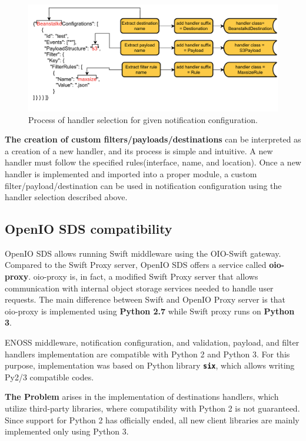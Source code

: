     \begin{figure}[H]
        \centering
        \includegraphics[width=1\textwidth]{obrazky-figures/enoss-handler-selection.pdf}
        \caption{Process of handler selection for given notification configuration.}
        \label{fig:enoss-handler-selection}
    \end{figure}

    \textbf{The creation of custom filters/payloads/destinations} can be interpreted as a creation of a new handler, and its process is simple and intuitive. A new handler must follow the specified rules(interface, name, and location). Once a new handler is implemented and imported into a proper module, a custom filter/payload/destination can be used in notification configuration using the handler selection described above.

    \subsection{OpenIO SDS compatibility}
    OpenIO SDS allows running Swift middleware using the OIO-Swift gateway. Compared to the Swift Proxy server, OpenIO SDS offers a service called \textbf{oio-proxy}. oio-proxy is, in fact, a modified Swift Proxy server that allows communication with internal object storage services needed to handle user requests. The main difference between Swift and OpenIO Proxy server is that oio-proxy is implemented using \textbf{Python 2.7} while Swift proxy runs on \textbf{Python 3}.

    ENOSS middleware, notification configuration, and validation, payload, and filter handlers implementation are compatible with Python 2 and Python 3. For this purpose, implementation was based on Python library \textbf{\texttt{six}}, which allows writing Py2/3 compatible codes.

    \textbf{The Problem} arises in the implementation of destinations handlers, which utilize third-party libraries, where compatibility with Python 2 is not guaranteed. Since support for Python 2 has officially ended, all new client libraries are mainly implemented only using Python 3.

